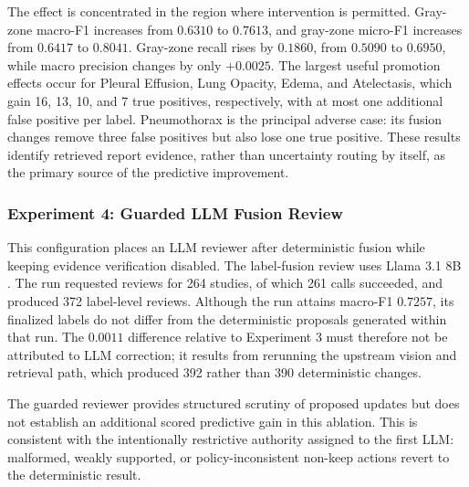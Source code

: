 The effect is concentrated in the region where intervention is permitted. Gray-zone macro-F1 increases from $0.6310$ to $0.7613$, and gray-zone micro-F1 increases from $0.6417$ to $0.8041$. Gray-zone recall rises by $0.1860$, from $0.5090$ to $0.6950$, while macro precision changes by only $+0.0025$. The largest useful promotion effects occur for Pleural Effusion, Lung Opacity, Edema, and Atelectasis, which gain 16, 13, 10, and 7 true positives, respectively, with at most one additional false positive per label. Pneumothorax is the principal adverse case: its fusion changes remove three false positives but also lose one true positive. These results identify retrieved report evidence, rather than uncertainty routing by itself, as the primary source of the predictive improvement.

\subsubsection{Experiment 4: Guarded LLM Fusion Review}

This configuration places an LLM reviewer after deterministic fusion while keeping evidence verification disabled. The label-fusion review uses Llama 3.1 8B \cite{grattafiori2024llama3}. The run requested reviews for 264 studies, of which 261 calls succeeded, and produced 372 label-level reviews. Although the run attains macro-F1 $0.7257$, its finalized labels do not differ from the deterministic proposals generated within that run. The $0.0011$ difference relative to Experiment 3 must therefore not be attributed to LLM correction; it results from rerunning the upstream vision and retrieval path, which produced 392 rather than 390 deterministic changes.

The guarded reviewer provides structured scrutiny of proposed updates but does not establish an additional scored predictive gain in this ablation. This is consistent with the intentionally restrictive authority assigned to the first LLM: malformed, weakly supported, or policy-inconsistent non-keep actions revert to the deterministic result.

\begin{table}[H]
\centering
\caption{Full-test Judge results for the four ablation configurations. All values are computed on the same 906 studies and 12-label output space.}
\label{tab:ablation-full-results}
\end{table}

